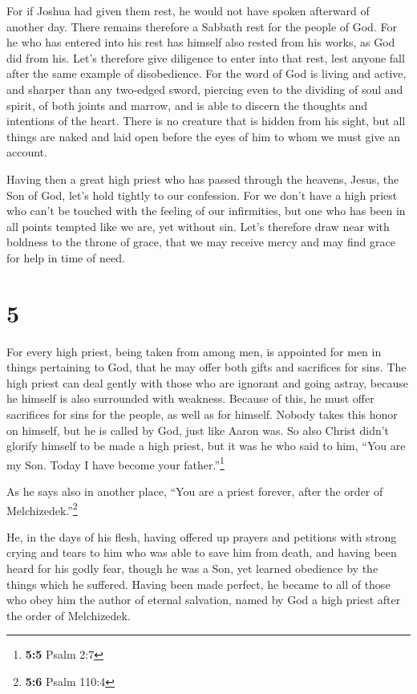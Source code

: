  For if Joshua had given them rest, he would not have
spoken afterward of another day.  There remains therefore
a Sabbath rest for the people of God.  For he who has
entered into his rest has himself also rested from his works, as God did
from his.  Let's therefore give diligence to enter into
that rest, lest anyone fall after the same example of disobedience.
 For the word of God is living and active, and sharper
than any two-edged sword, piercing even to the dividing of soul and
spirit, of both joints and marrow, and is able to discern the thoughts
and intentions of the heart.  There is no creature that
is hidden from his sight, but all things are naked and laid open before
the eyes of him to whom we must give an account.

 Having then a great high priest who has passed through
the heavens, Jesus, the Son of God, let's hold tightly to our
confession.  For we don't have a high priest who can't be
touched with the feeling of our infirmities, but one who has been in all
points tempted like we are, yet without sin.  Let's
therefore draw near with boldness to the throne of grace, that we may
receive mercy and may find grace for help in time of need.

\hypertarget{section-4}{%
\section{5}\label{section-4}}

 For every high priest, being taken from among men, is
appointed for men in things pertaining to God, that he may offer both
gifts and sacrifices for sins.  The high priest can deal
gently with those who are ignorant and going astray, because he himself
is also surrounded with weakness.  Because of this, he
must offer sacrifices for sins for the people, as well as for himself.
 Nobody takes this honor on himself, but he is called by
God, just like Aaron was.  So also Christ didn't glorify
himself to be made a high priest, but it was he who said to him, ``You
are my Son. Today I have become your father.''\footnote{\textbf{5:5}
  Psalm 2:7}

 As he says also in another place, ``You are a priest
forever, after the order of Melchizedek.''\footnote{\textbf{5:6} Psalm
  110:4}

 He, in the days of his flesh, having offered up prayers
and petitions with strong crying and tears to him who was able to save
him from death, and having been heard for his godly fear, 
though he was a Son, yet learned obedience by the things which he
suffered.  Having been made perfect, he became to all of
those who obey him the author of eternal salvation, 
named by God a high priest after the order of Melchizedek.

